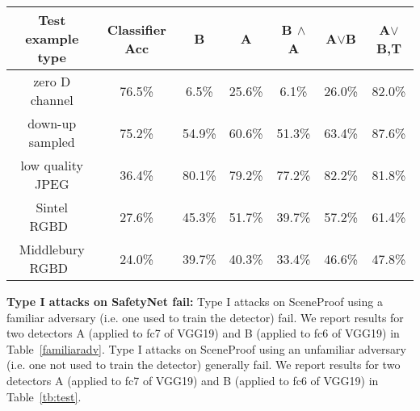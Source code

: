 \documentclass[10pt,twocolumn,letterpaper]{article}
\begin{document}
\begin{table*}[h!]
\begin{center}
\resizebox{0.72\textwidth}{!}
{
\begin{tabular}{  c | c  || c | c | c | c | c }
  Test example type  & Classifier Acc & B & A & B $\wedge$ A & A$\vee$B & A$\vee$B,T\\
  \hline
zero D channel  & 76.5\% & 6.5\% & 25.6\% & 6.1\% & 26.0\% & 82.0\% \\
down-up sampled  & 75.2\% & 54.9\% & 60.6\% & 51.3\% & 63.4\% & 87.6\% \\
low quality JPEG & 36.4\% & 80.1\% & 79.2\% & 77.2\% & 82.2\% & 81.8\% \\
Sintel RGBD~\cite{Butler:ECCV:2012} &  27.6\% & 45.3\% & 51.7\% & 39.7\% & 57.2\% & 61.4\% \\
Middlebury RGBD~\cite{scharstein2014high} &  24.0\% & 39.7\% & 40.3\% & 33.4\% & 46.6\% & 47.8\% \\
\end{tabular}
}
\vspace{0.5ex}
\caption{This table shows detailed information about behavior of classifiers and detectors, summarized in Table \protect~\ref{tb:summary}.
The table arrangement is same to Table~\ref{familiaradv}.
Type I attacks on SceneProof using an unfamiliar adversary (i.e. one not used to train the detector) generally fail. 
All these examples should be labelled false, {\em OR} rejected as adversarial.  The column for each detector reports the rate at
  which the detector identifies examples as adversarial.  For example, in the first row, 76.5\% of zero D channel
  RGBD images are correctly labelled as  false by the classifier; of those labelled ``true'', 82.0\% are rejected as
  adversarial (last column).  This means that a  total of 4.2\% of zero D channel RGBD images pass through SafetyNet with ``true'' labels.
}
\label{tb:test}
\vspace{-2ex}
\end{center}
\end{table*}

{\bf Type I attacks on SafetyNet fail:} Type I attacks on SceneProof using a familiar adversary (i.e. one used to train the detector) fail.  We report
  results for two detectors A (applied to fc7 of VGG19) and B (applied to fc6 of VGG19) in Table~\ref{familiaradv}.
  Type I attacks on SceneProof using an unfamiliar adversary (i.e. one not used to train the detector) generally   fail. We report
  results for two detectors A (applied to fc7 of VGG19) and B (applied to fc6 of VGG19) in Table~\ref{tb:test}. 
\end{document}
